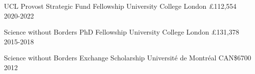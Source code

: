 
\begin{cvhonors}

  \cvhonor
    {UCL Provost Strategic Fund Fellowship} %
    {University College London} %
    {£112,554}%
    {2020-2022} %

\end{cvhonors}

\begin{cvhonors}

  \cvhonor
    {Science without Borders PhD Fellowship} %
    {University College London} %
    {£131,378}%
    {2015-2018} %




  \cvhonor
    {Science without Borders Exchange Scholarship} %
    {Universit\'e de Montr\'eal} %
    {CAN\$6700} %
    {2012} %

\end{cvhonors}
